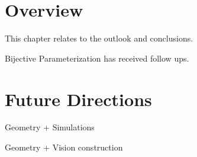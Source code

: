 \section{Overview}
This chapter relates to the outlook and conclusions.

Bijective Parameterization has received follow ups.
\section{Future Directions}
Geometry + Simulations

Geometry + Vision construction